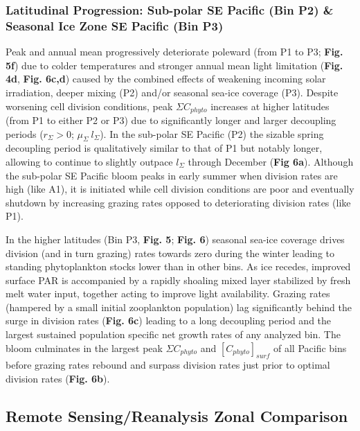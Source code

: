 \subsubsection{Latitudinal Progression: Sub-polar SE Pacific (Bin P2) \& Seasonal Ice Zone SE Pacific (Bin P3)}

Peak and annual mean  progressively deteriorate poleward (from P1 to P3; \textbf{Fig. 5f}) due to colder temperatures and stronger annual mean light limitation (\textbf{Fig. 4d}, \textbf{Fig. 6c,d}) caused by the combined effects of weakening incoming solar irradiation, deeper mixing (P2) and/or seasonal sea-ice coverage (P3). Despite worsening cell division conditions, peak $\Sigma C_{phyto}$  increases at higher latitudes (from P1 to either P2 or P3) due to significantly longer and larger decoupling periods ($r_\Sigma>0$; $\mu_\Sigma \> l_\Sigma$). In the sub-polar SE Pacific (P2) the sizable spring decoupling period is qualitatively similar to that of P1 but notably longer, allowing  to continue to slightly outpace $l_\Sigma$ through December (\textbf{Fig 6a}). Although the sub-polar SE Pacific bloom peaks in early summer when division rates are high (like A1), it is initiated while cell division conditions are poor and eventually shutdown by increasing grazing rates opposed to deteriorating division rates (like P1).

In the higher latitudes (Bin P3, \textbf{Fig. 5}; \textbf{Fig. 6}) seasonal sea-ice coverage drives division (and in turn grazing) rates towards zero during the winter leading to standing phytoplankton stocks lower than in other bins. As ice recedes, improved surface PAR is accompanied by a rapidly shoaling mixed layer stabilized by fresh melt water input, together acting to improve light availability. Grazing rates (hampered by a small initial zooplankton population) lag significantly behind the surge in division rates (\textbf{Fig. 6c}) leading to a long decoupling period and the largest sustained population specific net growth rates of any analyzed bin. The bloom culminates in the largest peak $\Sigma C_{phyto}$ and $[C_{phyto}]_{surf}$ of all Pacific bins before grazing rates rebound and surpass division rates just prior to optimal division rates (\textbf{Fig. 6b}).

\subsection{Remote Sensing/Reanalysis Zonal Comparison}

